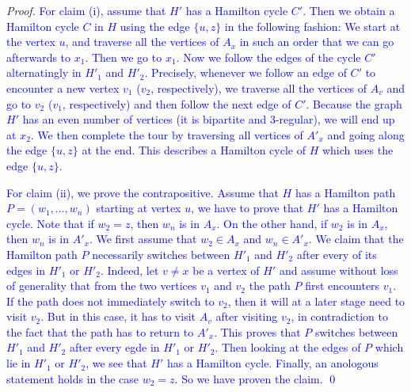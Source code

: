 \documentclass[runningheads]{llncs}
\newcommand{\set}[1]{\{ #1 \}}
\newcommand{\lasse}[1]{\textcolor{blue}{#1}}
\begin{document}
\begin{proof}
\lasse{
For claim (i), assume that $H'$ has a Hamilton cycle $C'$. Then we obtain a Hamilton cycle $C$ in $H$ using the edge $\set{u,z}$ in the following fashion: We start at the vertex $u$, and traverse all the vertices of $A_x$ in such an order that we can go afterwards to $x_1$. Then we go to $x_1$. Now we follow the edges of the cycle $C'$ alternatingly in $H'_1$ and $H'_2$. Precisely, whenever we follow an edge of $C'$ to encounter a new vertex $v_1$ ($v_2$, respectively), we traverse all the vertices of $A_v$ and go to $v_2$ ($v_1$, respectively) and then follow the next edge of $C'$. Because the graph $H'$ has an even number of vertices (it is bipartite and 3-regular), we will end up at $x_2$. We then complete the tour by traversing all vertices of $A'_x$ and going along the edge $\set{u,z}$ at the end. This describes a Hamilton cycle of $H$ which uses the edge $\set{u,z}$.
}

\lasse{
For claim (ii), we prove the contrapositive. Assume that $H$ has a Hamilton path $P = (w_1,\dots,w_n)$ starting at vertex $u$, we have to prove that $H'$ has a Hamilton cycle. Note that if $w_2 = z$, then $w_n$ is in $A_x$. On the other hand, if $w_2$ is in $A_x$, then $w_n$ is in $A'_x$. We first assume that $w_2 \in A_x$ and $w_n \in A'_x$.
We claim that the Hamilton path $P$ necessarily switches between $H'_1$ and $H'_2$ after every of its edges in $H'_1$ or $H'_2$. Indeed, let $v \neq x$ be a vertex of $H'$ and assume without loss of generality that from the two vertices $v_1$ and $v_2$ the path $P$ first encounters $v_1$. If the path does not immediately switch to $v_2$, then it will at a later stage need to visit $v_2$. But in this case, it has to visit $A_v$ after visiting $v_2$, in contradiction to the fact that the path has to return to $A'_x$. This proves that $P$ switches between $H'_1$ and $H'_2$ after every egde in $H'_1$ or $H'_2$. Then looking at the edges of $P$ which lie in $H'_1$ or $H'_2$, we see that $H'$ has a Hamilton cycle. Finally, an anologous statement holds in the case $w_2 = z$. So we have proven the claim. \qed
}
\end{proof}


\end{document}
